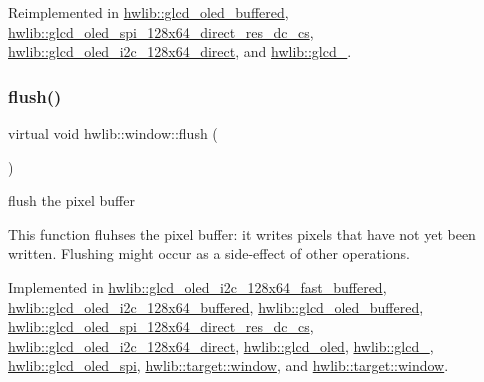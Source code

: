 Reimplemented in \hyperlink{classhwlib_1_1glcd__oled__buffered_a1df3ca6d163e33b2edf1242acf47342a}{hwlib\+::glcd\+\_\+oled\+\_\+buffered}, \hyperlink{classhwlib_1_1glcd__oled__spi__128x64__direct__res__dc__cs_afebf8245a39c31859ef21eae3d9deb69}{hwlib\+::glcd\+\_\+oled\+\_\+spi\+\_\+128x64\+\_\+direct\+\_\+res\+\_\+dc\+\_\+cs}, \hyperlink{classhwlib_1_1glcd__oled__i2c__128x64__direct_a283c1ff2e898f5f2b23dfdce6209b55e}{hwlib\+::glcd\+\_\+oled\+\_\+i2c\+\_\+128x64\+\_\+direct}, and \hyperlink{classhwlib_1_1glcd__5510_a533b2663e151bee909543d0038b2cb4d}{hwlib\+::glcd\+\_}.

\mbox{\label{classhwlib_1_1window_ace994a6b215325973cdcea5c5519955c}} 
\subsubsection{\texorpdfstring{flush()}{flush()}\hspace{0.1cm}{\footnotesize\ttfamily [1/2]}}
{\footnotesize\ttfamily virtual void hwlib\+::window\+::flush (\begin{DoxyParamCaption}{ }\end{DoxyParamCaption})\hspace{0.3cm}{\ttfamily [pure virtual]}}

flush the pixel buffer

This function fluhses the pixel buffer\+: it writes pixels that have not yet been written. Flushing might occur as a side-\/effect of other operations. 

Implemented in \hyperlink{classhwlib_1_1glcd__oled__i2c__128x64__fast__buffered_a799b9725f8b535d8fe22b18ffd98af8e}{hwlib\+::glcd\+\_\+oled\+\_\+i2c\+\_\+128x64\+\_\+fast\+\_\+buffered}, \hyperlink{classhwlib_1_1glcd__oled__i2c__128x64__buffered_aa2f62fb4a54ea1cfa9f608e703fd046e}{hwlib\+::glcd\+\_\+oled\+\_\+i2c\+\_\+128x64\+\_\+buffered}, \hyperlink{classhwlib_1_1glcd__oled__buffered_a68ed87e12c7f7ed0abe621b14af9d604}{hwlib\+::glcd\+\_\+oled\+\_\+buffered}, \hyperlink{classhwlib_1_1glcd__oled__spi__128x64__direct__res__dc__cs_ada856fccd0e72f8e95172e1aa901024c}{hwlib\+::glcd\+\_\+oled\+\_\+spi\+\_\+128x64\+\_\+direct\+\_\+res\+\_\+dc\+\_\+cs}, \hyperlink{classhwlib_1_1glcd__oled__i2c__128x64__direct_a65a496d65b3a99fe9334e0981b706533}{hwlib\+::glcd\+\_\+oled\+\_\+i2c\+\_\+128x64\+\_\+direct}, \hyperlink{classhwlib_1_1glcd__oled_a58e191e5350f349facee130513a08b75}{hwlib\+::glcd\+\_\+oled}, \hyperlink{classhwlib_1_1glcd__5510_ac53cb29b0973166ae3f54940a71317bf}{hwlib\+::glcd\+\_}, \hyperlink{classhwlib_1_1glcd__oled__spi_a4bed9116dda2cc6752ac5447a834fa0f}{hwlib\+::glcd\+\_\+oled\+\_\+spi}, \hyperlink{classhwlib_1_1target_1_1window_a00ef1d2bba8684306ee8051fbf469900}{hwlib\+::target\+::window}, and \hyperlink{classhwlib_1_1target_1_1window_a00ef1d2bba8684306ee8051fbf469900}{hwlib\+::target\+::window}.

